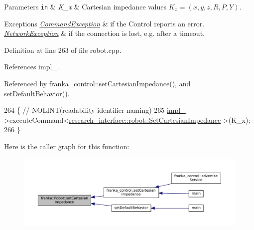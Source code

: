 \begin{DoxyParams}[1]{Parameters}
\mbox{\tt in}  & {\em K\+\_\+x} & Cartesian impedance values $K_x=(x, y, z, R, P, Y)$.\\
\hline
\end{DoxyParams}

\begin{DoxyExceptions}{Exceptions}
{\em \hyperlink{structfranka_1_1CommandException}{Command\+Exception}} & if the Control reports an error. \\
\hline
{\em \hyperlink{structfranka_1_1NetworkException}{Network\+Exception}} & if the connection is lost, e.\+g. after a timeout. \\
\hline
\end{DoxyExceptions}


Definition at line 263 of file robot.\+cpp.



References impl\+\_\+.



Referenced by franka\+\_\+control\+::set\+Cartesian\+Impedance(), and set\+Default\+Behavior().


\begin{DoxyCode}
264                                     \{  \textcolor{comment}{// NOLINT(readability-identifier-naming)}
265   \hyperlink{classfranka_1_1Robot_aca155054184e5b6478942fd6a1b82ba4}{impl\_}->executeCommand<\hyperlink{structresearch__interface_1_1robot_1_1SetCartesianImpedance}{research\_interface::robot::SetCartesianImpedance}
      >(K\_x);
266 \}
\end{DoxyCode}
Here is the caller graph for this function\+:
\nopagebreak
\begin{figure}[H]
\begin{center}
\leavevmode
\includegraphics[width=350pt]{classfranka_1_1Robot_ac2678c5c31cc8c0627ecda7485f81f6d_icgraph}
\end{center}
\end{figure}
\mbox{\label{classfranka_1_1Robot_a168e1214ac36d74ac64f894332b84534}} 
